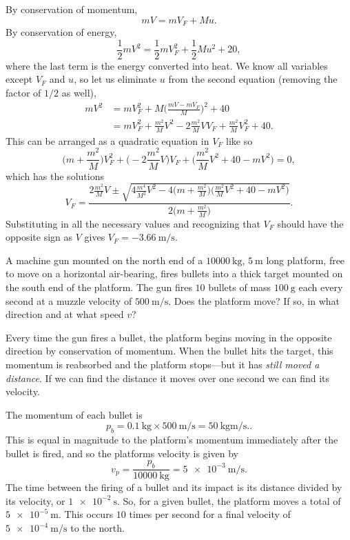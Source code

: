 \documentclass[../feynman-lectures-on-physics.tex]{subfiles}
\begin{document}
\begin{questions}
	\begin{solution}
		By conservation of momentum,
		\[
			mV = mV_F + Mu.
		\]
		By conservation of energy,
		\[
			\frac{1}{2}mV^2 = \frac{1}{2}mV_F^2 + \frac{1}{2}Mu^2 + 20,
		\]
		where the last term is the energy converted into heat. We know all variables
		except $V_F$ and $u$, so let us eliminate $u$ from the second equation
		(removing the factor of $1/2$ as well),
		\begin{align*}
			mV^2 &= mV_F^2 + M\Big(\frac{mV-mV_F}{M}\Big)^2 + 40 \\
			     &= mV_F^2 + \frac{m^2}{M}V^2 - 2\frac{m^2}{M}VV_F + \frac{m^2}{M}V_F^2 + 40.
		\end{align*}
		This can be arranged as a quadratic equation in $V_F$ like so
		\[
			\Big(m + \frac{m^2}{M}\Big)V_F^2 + \Big(-2\frac{m^2}{M}V\Big)V_F + \Big(\frac{m^2}{M}V^2 + 40
			- mV^2\Big) = 0,
		\]
		which has the solutions
		\[
			V_F = \frac{2\frac{m^2}{M}V \pm \sqrt{4\frac{m^4}{M^2}V^2 -
			4\Big(m+\frac{m^2}{M}\Big)\Big(\frac{m^2}{M}V^2 + 40 - mV^2\Big)}}{2\Big(m+\frac{m^2}{M}\Big)}.
		\]
		Substituting in all the necessary values and recognizing that $V_F$ should
		have the opposite sign as $V$ gives $V_F = \SI{-3.66}{\meter\per\second}$.
	\end{solution}

	\question A machine gun mounted on the north end of a $\SI{10000}{\kilo\gram}$, $\SI{5}{\meter}$ long platform, free to move on a horizontal air-bearing, fires bullets into a thick target mounted on the south end of the platform. The gun fires $10$ bullets of mass $\SI{100}{\gram}$ each every second at a muzzle velocity of $\SI{500}{\meter\per\second}$. Does the platform move? If so, in what direction and at what speed $v$?

	\begin{solution}
		Every time the gun fires a bullet, the platform begins moving in the opposite direction by conservation of momentum. When the bullet hits the target, this momentum is reabsorbed and the platform stops---but it has \textit{still moved a distance}. If we can find the distance it moves over one second we can find its velocity.

		The momentum of each bullet is
	\[
		p_b = \SI{0.1}{\kilo\gram}\times\SI{500}{\meter\per\second}=\SI{50}{\kilo\gram\meter\per\second}.
	.\] 	
		This is equal in magnitude to the platform's momentum immediately after the bullet is fired, and so the platforms velocity is given by 	
		\[
			v_p = \frac{p_b}{\SI{10000}{\kilo\gram}} = \SI{5e-3}{\meter\per\second}
		.\] 
		The time between the firing of a bullet and its impact is its distance divided by its velocity, or $\SI{1e-2}{\second}$. So, for a given bullet, the platform moves a total of $\SI{5e-5}{\meter}$. This occurs $10$ times per second for a final velocity of $\SI{5e-4}{\meter\per\second}$ to the north.
	\end{solution}


\end{questions}
\end{document}
